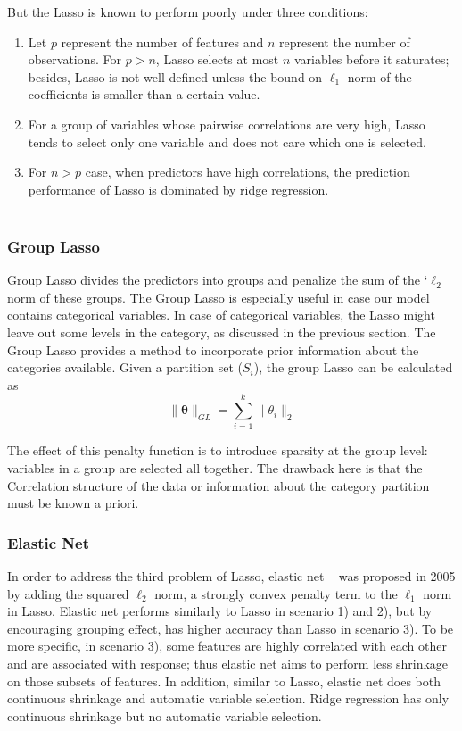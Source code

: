 \documentclass[11pt]{article}
\begin{document}
But the Lasso is known to perform poorly under three conditions:

\begin{enumerate} 

\item

Let $p$ represent the number of features and $n$ represent the number of observations. For $p>n$, Lasso selects at most $n$ variables before it saturates; besides, Lasso is not well defined unless the bound on $\ell_1$-norm of the coefficients is smaller than a certain value.
\item

For a group of variables whose pairwise correlations are very high, Lasso tends to select only one variable and does not care which one is selected.

\item

 For $n>p$ case, when predictors have high correlations, the prediction performance of Lasso is dominated by ridge regression.\\ \\
 \end{enumerate}


\subsubsection{Group Lasso}

Group Lasso divides the predictors into groups and penalize the sum of the `$\ell_2$ norm of these groups.
The Group Lasso is especially useful in case our model contains categorical variables. 
In case of categorical variables, the Lasso might leave out some levels in the category, as discussed in the previous section. 
The Group Lasso provides a method to incorporate prior information about the categories available.
Given a partition set ($S_i$), the group Lasso can be calculated as
$$ \|\mathbf{\theta}\|_{GL} = \sum \limits_{i=1}^k \|\theta_i\|_2 $$

The effect of this penalty function is to introduce sparsity at the group level: variables in a group are
selected all together.
The drawback here is that the Correlation structure of the data or information about the category partition must be known a priori. 
\subsubsection{Elastic Net}

In order to address the third problem of Lasso, elastic net ~\cite{Zou2005Reg} was proposed in 2005 by adding the squared $\ell_2$ norm, a strongly convex penalty term to the $\ell_1$ norm in Lasso. 
Elastic net performs similarly to Lasso in scenario 1) and 2), but by encouraging grouping effect, has higher accuracy than Lasso in scenario 3). 
To be more specific, in scenario 3), some features are highly correlated with each other and are associated with response; thus elastic net aims to perform less shrinkage on those subsets of features. 
In addition, similar to Lasso, elastic net does both continuous shrinkage and automatic variable selection. Ridge regression has only continuous shrinkage but no automatic variable selection.\\
\end{document}
